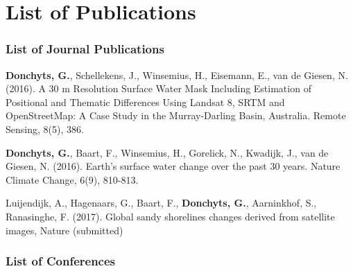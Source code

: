 \chapter*{List of Publications}

\label{publications}

\subsection*{List of Journal Publications}

\begin{etaremune}{\small

\item \textbf{Donchyts, G.}, Schellekens, J., Winsemius, H., Eisemann, E., van de Giesen, N. (2016). A 30 m Resolution Surface Water Mask Including Estimation of Positional and Thematic Differences Using Landsat 8, SRTM and OpenStreetMap: A Case Study in the Murray-Darling Basin, Australia. Remote Sensing, 8(5), 386.

\item \textbf{Donchyts, G.}, Baart, F., Winsemius, H., Gorelick, N., Kwadijk, J., van de Giesen, N. (2016). Earth's surface water change over the past 30 years. Nature Climate Change, 6(9), 810-813.

\item Luijendijk, A., Hagenaars, G., Baart, F., \textbf{Donchyts, G.}, Aarninkhof, S., Ranasinghe, F. (2017). Global sandy shorelines changes derived from satellite images, Nature (submitted)



}\end{etaremune}


\subsection*{List of Conferences}

